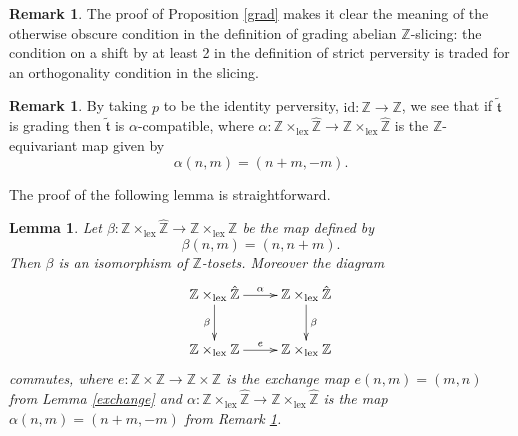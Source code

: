 \documentclass{article}
\newtheorem{prop}[thm]{Proposition}
\newtheorem{lem}[thm]{Lemma}
\theoremstyle{definition}
\newtheorem{rem}[thm]{Remark}
\newcommand{\Z}{\mathbb{Z}}
\newcommand{\tee}{\mathfrak{t}}
\begin{document}
\begin{rem}
The proof of Proposition \ref{grad} makes it clear the meaning of the otherwise obscure condition in the definition of grading abelian $\Z$-slicing: the condition on a shift by at least 2 in the definition of strict perversity is traded for an  orthogonality condition in the slicing. 
\end{rem}



\begin{rem}\label{alpha}
By taking $p$ to be the identity perversity, $\mathrm{id}\colon \Z\to \Z$, we see that if $\tilde{\tee}$ is grading then $\tilde{\tee}$ is $\alpha$-compatible, where $\alpha\colon \mathbb{Z} \times_{\mathrm{lex}} \hat{\mathbb{Z}}\to \mathbb{Z} \times_{\mathrm{lex}} \hat{\mathbb{Z}}$ is the $\Z$-equivariant map given by
\[
\alpha(n,m)=(n+m,-m).
\]
\end{rem}

The proof of the following lemma is straightforward.
\begin{lem}\label{from-alpha-to-e}
Let $\beta\colon \mathbb{Z} \times_{\mathrm{lex}} \hat{\mathbb{Z}}\to \mathbb{Z} \times_{\mathrm{lex}} {\mathbb{Z}}$ be the map defined by
\[
\beta(n,m)=(n,n+m).
\]
Then $\beta$ is an isomorphism of $\Z$-tosets. Moreover the diagram
\[
\xymatrix{
\mathbb{Z} \times_{\mathrm{lex}} \hat{\mathbb{Z}}\ar[r]^{\alpha}\ar[d]_{\beta}& \mathbb{Z} \times_{\mathrm{lex}} \hat{\mathbb{Z}}\ar[d]^{\beta}\\
\mathbb{Z} \times_{\mathrm{lex}} {\mathbb{Z}}\ar[r]^{e}& \mathbb{Z} \times_{\mathrm{lex}} {\mathbb{Z}}
}
\]
commutes,
where $e\colon \Z\times \Z \to \Z\times \Z$ is the exchange map $e(n,m)=(m,n)$ from Lemma \ref{exchange} and $\alpha\colon \mathbb{Z} \times_{\mathrm{lex}} \hat{\mathbb{Z}}\to \mathbb{Z} \times_{\mathrm{lex}} \hat{\mathbb{Z}}$ is the map $\alpha(n,m)=(n+m,-m)$ from Remark \ref{alpha}.
\end{lem}
\end{document}
